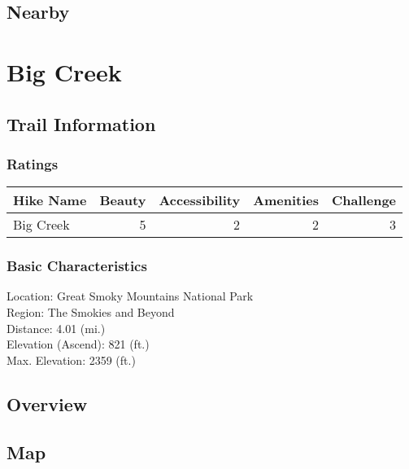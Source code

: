 \documentclass[
]{book}
\begin{document}
\hypertarget{nearby-14}{%
\section{Nearby}\label{nearby-14}}

\hypertarget{big-creek}{%
\chapter{Big Creek}\label{big-creek}}

\hypertarget{trail-information-14}{%
\section{Trail Information}\label{trail-information-14}}

\hypertarget{ratings-10}{%
\subsection{Ratings}\label{ratings-10}}

\begin{tabular}{l|r|r|r|r}
\hline
Hike Name & Beauty & Accessibility & Amenities & Challenge\\
\hline
Big Creek & 5 & 2 & 2 & 3\\
\hline
\end{tabular}

\hypertarget{basic-characteristics-14}{%
\subsection{Basic Characteristics}\label{basic-characteristics-14}}

Location: Great Smoky Mountains National Park\\
Region: The Smokies and Beyond\\
Distance: 4.01 (mi.)\\
Elevation (Ascend): 821 (ft.)\\
Max. Elevation: 2359 (ft.)

\hypertarget{overview-14}{%
\section{Overview}\label{overview-14}}

\hypertarget{map-14}{%
\section{Map}\label{map-14}}
\end{document}
